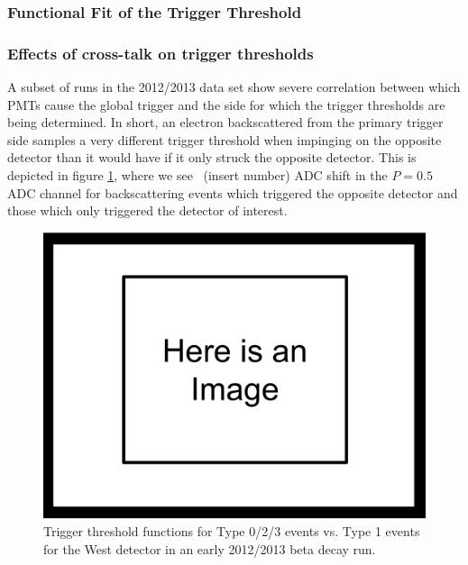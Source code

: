 \subsubsection{Functional Fit of the Trigger Threshold}

\subsubsection{Effects of cross-talk on trigger thresholds}

A subset of runs in the 2012/2013 data set show severe correlation between 
which PMTs cause the global trigger and the side for which the trigger thresholds 
are being determined. In short, an electron backscattered from the primary trigger
side samples a very different trigger threshold when impinging on the opposite detector 
than it would have if it only struck the opposite detector. This is depicted 
in figure \ref{fig:evtTypeTriggers}, where we see ~(insert number)
ADC shift in the $P=0.5$ ADC channel for backscattering events which triggered the
opposite detector and those which only triggered the detector of interest.

\begin{figure}[h] \label{fig:evtTypeTriggers}
\centering
\includegraphics[scale=.25]{3-UCNAAnalysis/ImageHolder.pdf}
\caption{Trigger threshold functions for Type 0/2/3 events vs. Type 1 events for the 
West detector in an early 2012/2013 beta decay run. }
\end{figure}



